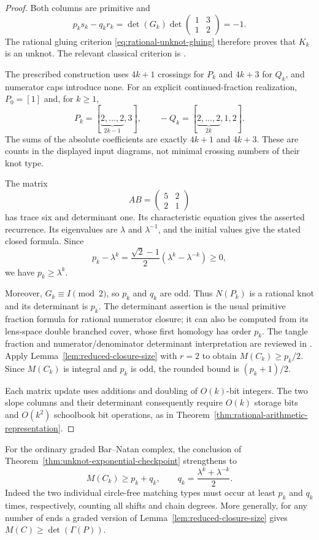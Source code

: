 \begin{proof}
Both columns are primitive and
\[
 p_ks_k-q_kr_k
 =\det(G_k)\det\begin{pmatrix}1&3\\1&2\end{pmatrix}
 =-1.
\]
The rational gluing criterion
\eqref{eq:rational-unknot-gluing} therefore proves that $K_k$ is an
unknot.  The relevant classical criterion is
\cite[Theorem~5]{KauffmanLambropoulouHard}.

The prescribed construction uses $4k+1$ crossings for $P_k$ and
$4k+3$ for $Q_k$, and numerator caps introduce none.
For an explicit continued-fraction realization, $P_0=[1]$ and, for
$k\ge1$,
\[
 P_k=[\underbrace{2,\ldots,2}_{2k-1},3],
 \qquad
 -Q_k=[\underbrace{2,\ldots,2}_{2k},1,2].
\]
The sums of the absolute coefficients are exactly $4k+1$ and
$4k+3$.  These are counts in the displayed input diagrams, not
minimal crossing numbers of their knot type.

The matrix
\[
 AB=\begin{pmatrix}5&2\\2&1\end{pmatrix}
\]
has trace six and determinant one.  Its characteristic equation
gives the asserted recurrence.  Its eigenvalues are
$\lambda$ and $\lambda^{-1}$, and the initial values give the stated
closed formula.  Since
\[
 p_k-\lambda^k
 =\frac{\sqrt2-1}{2}(\lambda^k-\lambda^{-k})\ge0,
\]
we have $p_k\ge\lambda^k$.

Moreover, $G_k\equiv I\pmod2$, so $p_k$ and $q_k$ are odd.
Thus $N(P_k)$ is a rational knot and its determinant is $p_k$.
The determinant assertion is the usual primitive fraction formula
for rational numerator closure; it can also be computed from its
lens-space double branched cover, whose first homology has order
$p_k$.  The tangle fraction and numerator/denominator determinant
interpretation are reviewed in
\cite[Section~4.1, Remark~2]{KauffmanLambropoulouFractions}.
Apply Lemma~\ref{lem:reduced-closure-size} with $r=2$ to obtain
$M(C_k)\ge p_k/2$.  Since $M(C_k)$ is integral and $p_k$ is odd, the
rounded bound is $(p_k+1)/2$.

Each matrix update uses additions and doubling of $O(k)$-bit
integers.  The two slope columns and their determinant consequently
require $O(k)$ storage bits and $O(k^2)$ schoolbook bit operations,
as in Theorem~\ref{thm:rational-arithmetic-representation}.
\end{proof}

\begin{corollary}
\label{cor:graded-checkpoint-size}
For the ordinary graded Bar--Natan complex, the conclusion of
Theorem~\ref{thm:unknot-exponential-checkpoint} strengthens to
\[
 M(C_k)\ge p_k+q_k,
 \qquad q_k=\frac{\lambda^k+\lambda^{-k}}2.
\]
Indeed the two individual circle-free matching types must occur at
least $p_k$ and $q_k$ times, respectively, counting all shifts and
chain degrees.  More generally, for any number of ends a graded
version of Lemma~\ref{lem:reduced-closure-size} gives
$M(C)\ge\det(\Gamma(P))$.
\end{corollary}

